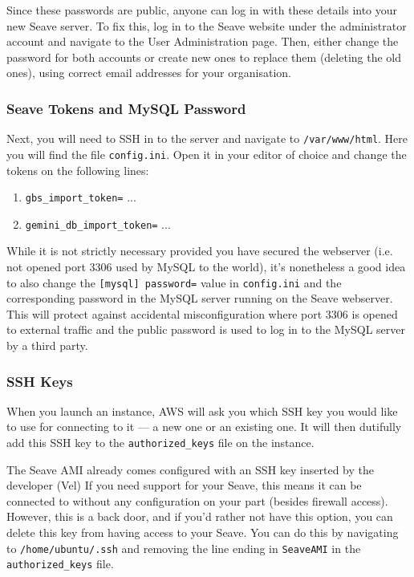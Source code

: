 \documentclass[11pt, a4paper]{article}
\begin{document}
Since these passwords are public, anyone can log in with these details into your new Seave server. To fix this, log in to the Seave website under the administrator account and navigate to the User Administration page. Then, either change the password for both accounts or create new ones to replace them (deleting the old ones), using correct email addresses for your organisation.

\subsubsection{Seave Tokens and MySQL Password}

Next, you will need to SSH in to the server and navigate to \texttt{/var/www/html}. Here you will find the file \texttt{config.ini}. Open it in your editor of choice and change the tokens on the following lines:
\begin{enumerate}
	\item \texttt{gbs\_import\_token=} ...
	\item \texttt{gemini\_db\_import\_token=} ...
\end{enumerate}

While it is not strictly necessary provided you have secured the webserver (i.e. not opened port 3306 used by MySQL to the world), it's nonetheless a good idea to also change the \texttt{[mysql] password=} value in \texttt{config.ini} and the corresponding password in the MySQL server running on the Seave webserver. This will protect against accidental misconfiguration where port 3306 is opened to external traffic and the public password is used to log in to the MySQL server by a third party.

\subsubsection{SSH Keys}

When you launch an instance, AWS will ask you which SSH key you would like to use for connecting to it --- a new one or an existing one. It will then dutifully add this SSH key to the \texttt{authorized\_keys} file on the instance.

The Seave AMI already comes configured with an SSH key inserted by the developer (Vel) If you need support for your Seave, this means it can be connected to without any configuration on your part (besides firewall access). However, this is a back door, and if you'd rather not have this option, you can delete this key from having access to your Seave. You can do this by navigating to \texttt{/home/ubuntu/.ssh} and removing the line ending in \texttt{SeaveAMI} in the \texttt{authorized\_keys} file.
\end{document}
